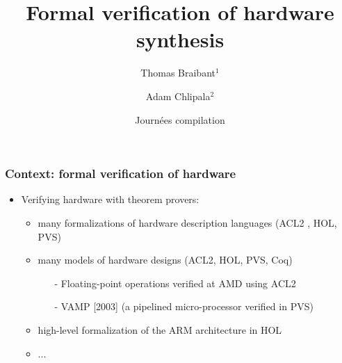 \documentclass[9pt]{beamer}
\title{Formal verification of hardware synthesis}%
\author[T. Braibant]{Thomas Braibant$^1$ \and Adam Chlipala$^2$}
\institute[Inria]{Inria$^1$ (Gallium) \qquad MIT CSAIL$^2$}
\date[04/2013]{Journées compilation}
\newcommand{\redemph}[1]{\alert{\emph{#1}}}
\begin{document}
\newcommand \orange[1]{{\color{orange}{#1}}}

\newcommand\parenthesis[1] {
  \begin{flushright}
    {\scriptsize \redemph{{{{ #1}}}}}
  \end{flushright}

}

\begin{frame}
  \center 
  \titlepage
\end{frame} 

\begin{frame}
  \frametitle{Context: formal verification of hardware}
  
  \begin{itemize}
    
    
  \item Verifying hardware with theorem provers:
    \begin{itemize}
    \item many formalizations of hardware description languages (ACL2 , HOL, PVS)
    \item many models of hardware designs (ACL2, HOL, PVS, Coq) 
      \begin{itemize}
      \item[-] Floating-point operations verified at AMD using ACL2 
      \item[-] VAMP [2003]  (a pipelined micro-processor verified in PVS)
      \end{itemize}
    \item high-level formalization of the ARM architecture in HOL
    \item ...
    \end{itemize}


\end{itemize}
\end{frame}
\end{document}

